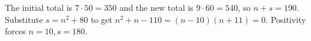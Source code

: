 The initial total is $7\cdot50=350$ and the new total is $9\cdot60=540$, so $n+s=190$. Substitute $s=n^2+80$ to get $n^2+n-110=(n-10)(n+11)=0$. Positivity forces $\boxed{n=10,s=180}$.
